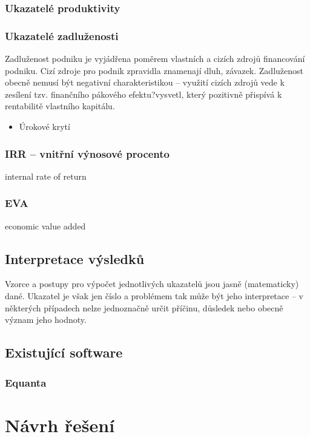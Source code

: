 \subsection{Ukazatelé produktivity}

\subsection{Ukazatelé zadluženosti}
Zadluženost podniku je vyjádřena poměrem vlastních a cizích zdrojů financování podniku. Cizí zdroje pro podnik zpravidla znamenají dluh, závazek. Zadluženost obecně nemusí být negativní charakteristikou -- využití cizích zdrojů vede k zesílení tzv. finančního pákového efektu?vysvetl, který pozitivně přispívá k rentabilitě vlastního kapitálu\cite{uk_zadl}.
\begin{itemize}
\item{Úrokové krytí}
\end{itemize}


\subsection{IRR -- vnitřní výnosové procento}
internal rate of return

\subsection{EVA}
economic value added



\section{Interpretace výsledků}
Vzorce a postupy pro výpočet jednotlivých ukazatelů jsou jasně (matematicky) dané. Ukazatel je však jen číslo a problémem tak může být jeho interpretace -- v některých případech nelze jednoznačně určit příčinu, důsledek nebo obecně význam jeho hodnoty. 

\section{Existující software}
\subsection{Equanta\sffamily\textregistered}

\chapter{Návrh řešení}
